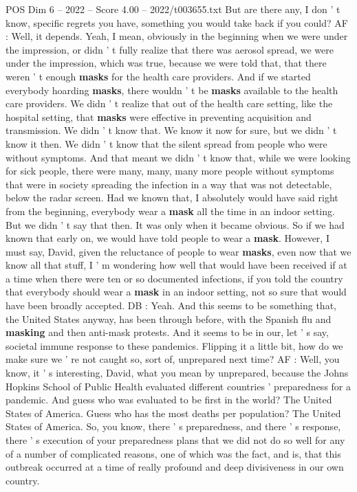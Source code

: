 \begin{textsample}{POS Dim 6 – 2022 – Score 4.00 – 2022/t003655.txt}
But are there any, I don ' t know, specific regrets you have, something you would take back if you could?
AF : Well, it depends.
Yeah, I mean, obviously in the beginning when we were under the impression, or didn ' t fully realize that there was aerosol spread, we were under the impression, which was true, because we were told that, that there weren ' t enough \textbf{masks} for the health care providers.
And if we started everybody hoarding \textbf{masks}, there wouldn ' t be \textbf{masks} available to the health care providers.
We didn ' t realize that out of the health care setting, like the hospital setting, that \textbf{masks} were effective in preventing acquisition and transmission.
We didn ' t know that.
We know it now for sure, but we didn ' t know it then.
We didn ' t know that the silent spread from people who were without symptoms.
And that meant we didn ' t know that, while we were looking for sick people, there were many, many, many more people without symptoms that were in society spreading the infection in a way that was not detectable, below the radar screen.
Had we known that, I absolutely would have said right from the beginning, everybody wear a \textbf{mask} all the time in an indoor setting.
But we didn ' t say that then.
It was only when it became obvious.
So if we had known that early on, we would have told people to wear a \textbf{mask}.
However, I must say, David, given the reluctance of people to wear \textbf{masks}, even now that we know all that stuff, I ' m wondering how well that would have been received if at a time when there were ten or so documented infections, if you told the country that everybody should wear a \textbf{mask} in an indoor setting, not so sure that would have been broadly accepted.
DB : Yeah.
And this seems to be something that, the United States anyway, has been through before, with the Spanish flu and \textbf{masking} and then anti-mask protests.
And it seems to be in our, let ' s say, societal immune response to these pandemics.
Flipping it a little bit, how do we make sure we ' re not caught so, sort of, unprepared next time?
AF : Well, you know, it ' s interesting, David, what you mean by unprepared, because the Johns Hopkins School of Public Health evaluated different countries ' preparedness for a pandemic.
And guess who was evaluated to be first in the world?
The United States of America.
Guess who has the most deaths per population?
The United States of America.
So, you know, there ' s preparedness, and there ' s response, there ' s execution of your preparedness plans that we did not do so well for any of a number of complicated reasons, one of which was the fact, and is, that this outbreak occurred at a time of really profound and deep divisiveness in our own country.

\end{textsample}
